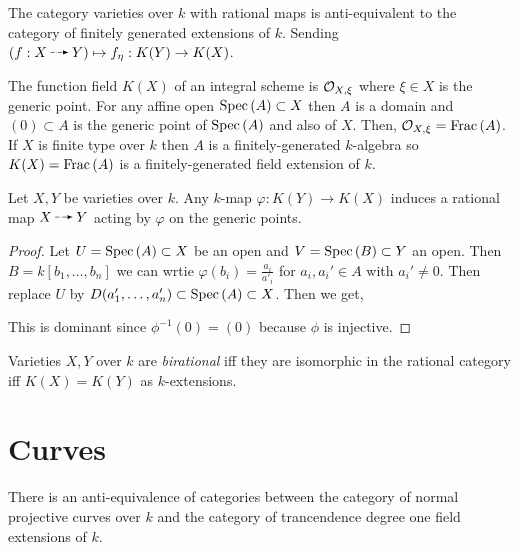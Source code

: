 \documentclass[12pt]{article}
\begin{document}
\begin{theorem}
The category varieties over $k$ with rational maps is anti-equivalent to the category of finitely generated extensions of $k$. Sending $(f : X \rat Y) \mapsto f_\eta : K(Y) \to K(X)$. 
\end{theorem}

\begin{defn}
The function field $K(X)$ of an integral scheme  is $\mathcal{O}_{X, \xi}$ where $\xi \in X$ is the generic point. For any affine open $\mathrm{Spec}\left( A \right) \subset X$ then $A$ is a domain and $(0) \subset A$ is the generic point of $\mathrm{Spec}\left( A \right)$ and also of $X$. Then, $\mathcal{O}_{X, \xi} = \mathrm{Frac}\left(A\right)$. If $X$ is finite type over $k$ then $A$ is a finitely-generated $k$-algebra so $K(X) = \mathrm{Frac}\left(A\right)$ is a finitely-generated field extension of $k$.
\end{defn}

\begin{lemma}
Let $X, Y$ be varieties over $k$. Any $k$-map $\varphi : K(Y) \to K(X)$ induces a rational map $X \rat Y$ acting by $\varphi$ on the generic points.
\end{lemma}

\begin{proof}
Let $U = \mathrm{Spec}\left( A \right) \subset X$ be an open and $V = \mathrm{Spec}\left( B \right) \subset Y$ an open. Then $B = k[b_1, \dots, b_n]$ we can wrtie $\varphi(b_i) = \frac{a_i}{a'_i}$ for $a_i, a_i' \in A$ with $a_i' \neq 0$. Then replace $U$ by $D(a_1', \dots, a_n') \subset \mathrm{Spec}\left( A \right) \subset X$. Then we get,
\begin{center}
\end{center}
This is dominant since $\phi^{-1}(0) = (0)$ because $\phi$ is injective. 
\end{proof}

\begin{defn}
Varieties $X, Y$ over $k$ are \textit{birational} iff they are isomorphic in the rational category iff $K(X) = K(Y)$ as $k$-extensions.
\end{defn}

\section{Curves}

\begin{theorem}
There is an anti-equivalence of categories between the category of normal projective curves over $k$ and the category of trancendence degree one field extensions of $k$.
\end{theorem}
\end{document}

